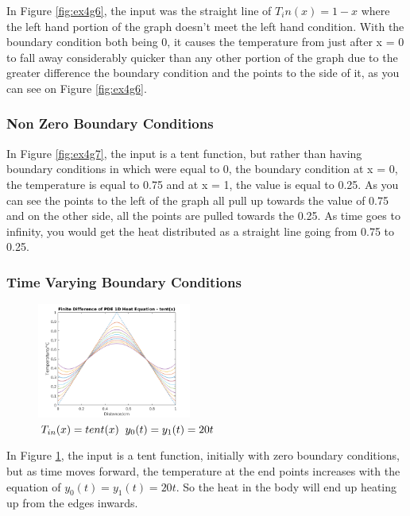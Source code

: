 \documentclass[11pt,a4paper]{article}
\begin{document}
In Figure \ref{fig:ex4g6}, the input was the straight line of $T_in(x) = 1-x$ where the left hand portion of the graph doesn't meet the left hand condition. With the boundary condition both being 0, it causes the temperature from just after x = 0 to fall away considerably quicker than any other portion of the graph due to the greater difference the boundary condition and the points to the side of it, as you can see on Figure \ref{fig:ex4g6}.

\subsubsection{Non Zero Boundary Conditions}

In Figure \ref{fig:ex4g7}, the input is a tent function, but rather than having boundary conditions in which were equal to 0, the boundary condition at x = 0, the temperature is equal to 0.75 and at x = 1, the value is equal to 0.25. As you can see the points to the left of the graph all pull up towards the value of 0.75 and on the other side, all the points are pulled towards the 0.25. As time goes to infinity, you would get the heat distributed as a straight line going from 0.75 to 0.25.

\pagebreak

\subsubsection{Time Varying Boundary Conditions}

\begin{figure}
	\vspace{-6mm}
	\includegraphics[width=0.45\textwidth]{Ex4_Figs/timevar.png}
	\vspace{-3mm}
	\caption{$T_{in}(x)= tent(x) \hspace{2mm} y_0(t) = y_1(t) = 20t$}
	\label{fig:ex4g8}
\end{figure}

In Figure \ref{fig:ex4g8}, the input is a tent function, initially with zero boundary conditions, but as time moves forward, the temperature at the end points increases with the equation of $y_0(t) = y_1(t) = 20t$. So the heat in the body will end up heating up from the edges inwards.
\end{document}

